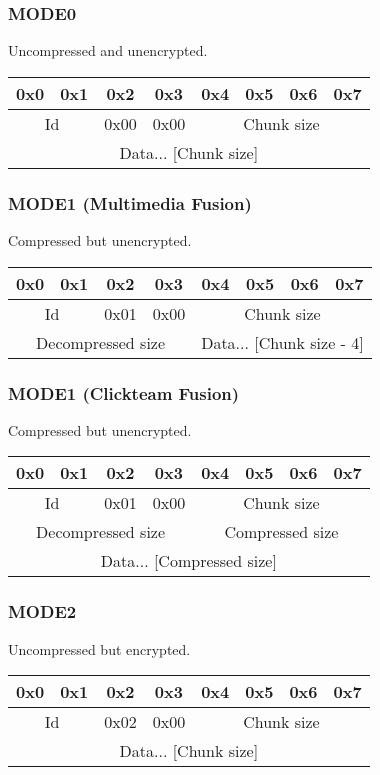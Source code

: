 \documentclass{article}
\begin{document}
\subsubsection{MODE0}
Uncompressed and unencrypted.
\\
\begin{tabular}{c|c|c|c|c|c|c|c}
  0x0 & 0x1 & 0x2 & 0x3 & 0x4 & 0x5 & 0x6 & 0x7
  \\ \hline
  \multicolumn{2}{|c|}{Id} &
  0x00 & 0x00 &
  \multicolumn{4}{|c|}{Chunk size}
  \\ \hline
  \multicolumn{8}{|c}{Data... [Chunk size]}
  \\ \hline
\end{tabular}

\subsubsection[MODE1 (MMF)]{MODE1 (Multimedia Fusion)}
Compressed but unencrypted.
\\
\begin{tabular}{c|c|c|c|c|c|c|c}
  0x0 & 0x1 & 0x2 & 0x3 & 0x4 & 0x5 & 0x6 & 0x7
  \\ \hline
  \multicolumn{2}{|c|}{Id} &
  0x01 & 0x00 &
  \multicolumn{4}{|c|}{Chunk size}
  \\ \hline
  \multicolumn{4}{|c|}{Decompressed size} &
  \multicolumn{4}{|c}{Data... [Chunk size - 4]}
  \\ \hline
\end{tabular}

\subsubsection[MODE1 (CTF)]{MODE1 (Clickteam Fusion)}
Compressed but unencrypted.
\\
\begin{tabular}{c|c|c|c|c|c|c|c}
  0x0 & 0x1 & 0x2 & 0x3 & 0x4 & 0x5 & 0x6 & 0x7
  \\ \hline
  \multicolumn{2}{|c|}{Id} &
  0x01 & 0x00 &
  \multicolumn{4}{|c|}{Chunk size}
  \\ \hline
  \multicolumn{4}{|c|}{Decompressed size} &
  \multicolumn{4}{|c|}{Compressed size}
  \\ \hline
  \multicolumn{8}{|c}{Data... [Compressed size]}
  \\ \hline
\end{tabular}

\subsubsection{MODE2}
Uncompressed but encrypted.
\\
\begin{tabular}{c|c|c|c|c|c|c|c}
  0x0 & 0x1 & 0x2 & 0x3 & 0x4 & 0x5 & 0x6 & 0x7
  \\ \hline
  \multicolumn{2}{|c|}{Id} &
  0x02 & 0x00 &
  \multicolumn{4}{|c|}{Chunk size}
  \\ \hline
  \multicolumn{8}{|c}{Data... [Chunk size]}
  \\ \hline
\end{tabular}
\end{document}
